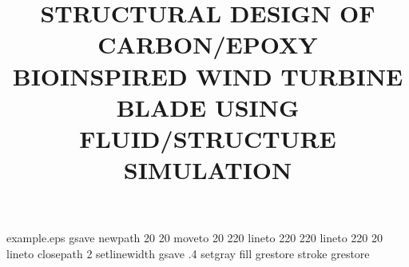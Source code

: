 %
%
%
%
%
\begin{filecontents*}{example.eps}
gsave
newpath
  20 20 moveto
  20 220 lineto
  220 220 lineto
  220 20 lineto
closepath
2 setlinewidth
gsave
  .4 setgray fill
grestore
stroke
grestore
\end{filecontents*}
%
\RequirePackage{fix-cm}
%
\documentclass[twocolumn]{svjour3}          %
%
\smartqed  %
%
\usepackage{graphicx}    %
\usepackage[utf8]{inputenc} %
\usepackage{multirow,array}  %
\usepackage{float}      %
 \usepackage{mathptmx}      %
\usepackage{amsmath}
%
%
%




\title{STRUCTURAL DESIGN OF CARBON/EPOXY BIOINSPIRED WIND TURBINE BLADE USING FLUID/STRUCTURE SIMULATION%
}


